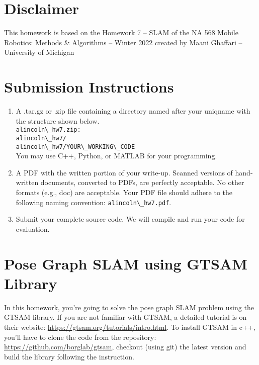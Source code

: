 \documentclass[tp]{lcc}
\begin{document}
\maketitle


\section{Disclaimer}
This homework is based on the Homework 7 -- SLAM of the NA 568 Mobile Robotics: Methods \& Algorithms -- Winter 2022 created by Maani Ghaffari -- University of Michigan

\section*{Submission Instructions}

\begin{enumerate}
    \item A .tar.gz or .zip file containing a directory named after your uniqname with the structure shown below. \\
    \lstinline[style=bash]{alincoln\_hw7.zip:} \\
    \lstinline[style=bash]{alincoln\_hw7/} \\
    \lstinline[style=bash]{alincoln\_hw7/YOUR\_WORKING\_CODE} \\
    You may use C++, Python, or MATLAB for your programming.

    \item A PDF with the written portion of your write-up. Scanned versions of hand-written documents, converted to PDFs, are perfectly acceptable. No other formats (e.g., doc) are acceptable. Your PDF file should adhere to the following naming convention: \lstinline[style=bash]{alincoln\_hw7.pdf}.

    \item Submit your complete source code. We will compile and run your code for evaluation.
\end{enumerate}

\section{Pose Graph SLAM using GTSAM Library}
In this homework, you’re going to solve the pose graph SLAM problem using the GTSAM library. If you are not familiar with GTSAM, a detailed tutorial is on their website: \url{https://gtsam.org/tutorials/intro.html}. To install GTSAM in c++, you’ll have to clone the code from the repository: \url{https://github.com/borglab/gtsam}, checkout (using git) the latest version and build the library following the instruction.
\end{document}
